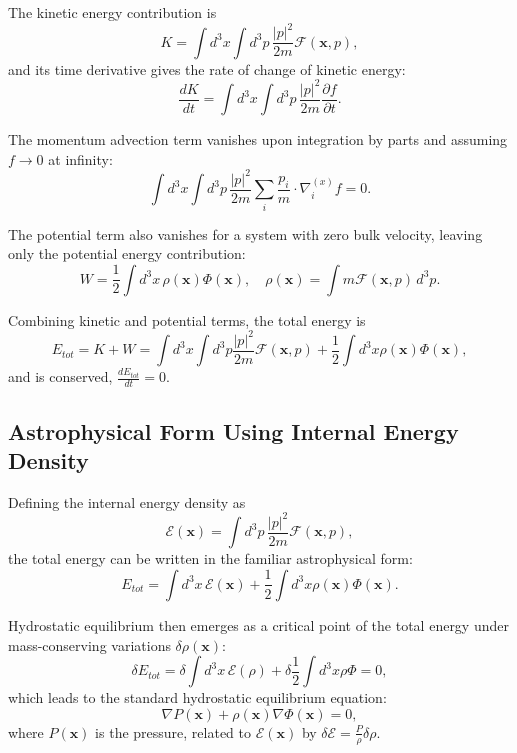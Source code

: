 \documentclass[12pt,a4paper]{article}
\numberwithin{equation}{section}
\begin{document}
The kinetic energy contribution is
\begin{equation}
K = \int d^3 x \int d^3 p \, \frac{|p|^2}{2 m} \mathcal{F}(\mathbf{x},{p}),
\end{equation}
and its time derivative gives the rate of change of kinetic energy:
\begin{equation}
\frac{d K}{d t} = \int d^3 x \int d^3 p \, \frac{|p|^2}{2 m} \frac{\partial f}{\partial t}.
\end{equation}

The momentum advection term vanishes upon integration by parts and assuming $f \to 0$ at infinity:
\begin{equation}
\int d^3 x \int d^3 p \, \frac{|p|^2}{2 m} \sum_i \frac{p_i}{m} \cdot \nabla_i^{(x)} f = 0.
\end{equation}

The potential term also vanishes for a system with zero bulk velocity, leaving only the potential energy contribution:
\begin{equation}
W = \frac{1}{2} \int d^3 x \, \rho(\mathbf{x}) \Phi(\mathbf{x}), \quad \rho(\mathbf{x}) = \int m \mathcal{F}(\mathbf{x},{p}) \, d^3 p.
\end{equation}

Combining kinetic and potential terms, the total energy is
\begin{equation}
E_{tot} = K + W = \int d^3 x \int d^3 p \frac{|p|^2}{2 m} \mathcal{F}(\mathbf{x},{p}) +\frac{1}{2} \int d^3 x \rho(\mathbf{x})\Phi(\mathbf{x}),
\end{equation}
and is conserved, $\frac{d E_{tot}}{d t} = 0$.

\subsection{Astrophysical Form Using Internal Energy Density}
Defining the internal energy density as
\begin{equation}
\mathcal{E}(\mathbf{x}) = \int d^3 p \, \frac{|p|^2}{2 m} \mathcal{F}(\mathbf{x},{p}),
\end{equation}
the total energy can be written in the familiar astrophysical form:
\begin{equation}
E_{tot} = \int d^3 x \, \mathcal{E}(\mathbf{x}) + \frac{1}{2} \int d^3 x \rho(\mathbf{x}) \Phi(\mathbf{x}).
\end{equation}

Hydrostatic equilibrium then emerges as a critical point of the total energy under mass-conserving variations $\delta \rho(\mathbf{x})$:
\begin{equation}
\delta E_{tot} = \delta \int d^3 x \, \mathcal{E}(\rho) + \delta \frac{1}{2} \int d^3 x \rho \Phi = 0,
\end{equation}
which leads to the standard hydrostatic equilibrium equation:
\begin{equation}
\nabla P(\mathbf{x}) + \rho(\mathbf{x}) \nabla \Phi(\mathbf{x}) = 0,
\end{equation}
where $P(\mathbf{x})$ is the pressure, related to $\mathcal{E}(\mathbf{x})$ by $\delta \mathcal{E} = \frac{P}{\rho} \delta \rho$.
\end{document}
